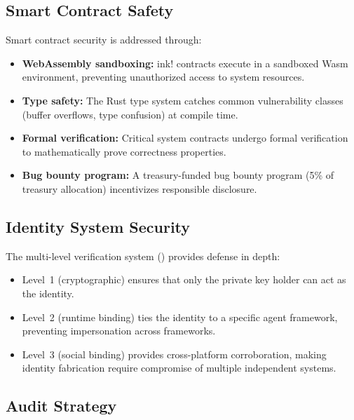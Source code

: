 \subsection{Smart Contract Safety}
\label{sec:contract-safety}

Smart contract security is addressed through:

\begin{itemize}[nosep]
    \item \textbf{WebAssembly sandboxing:} ink! contracts execute in a sandboxed Wasm environment, preventing unauthorized access to system resources.
    
    \item \textbf{Type safety:} The Rust type system catches common vulnerability classes (buffer overflows, type confusion) at compile time.
    
    \item \textbf{Formal verification:} Critical system contracts undergo formal verification to mathematically prove correctness properties.
    
    \item \textbf{Bug bounty program:} A treasury-funded bug bounty program (5\% of treasury allocation) incentivizes responsible disclosure.
\end{itemize}

\subsection{Identity System Security}

The multi-level verification system () provides defense in depth:

\begin{itemize}[nosep]
    \item Level~1 (cryptographic) ensures that only the private key holder can act as the identity.
    \item Level~2 (runtime binding) ties the identity to a specific agent framework, preventing impersonation across frameworks.
    \item Level~3 (social binding) provides cross-platform corroboration, making identity fabrication require compromise of multiple independent systems.
\end{itemize}

\subsection{Audit Strategy}

